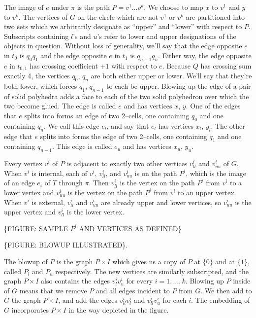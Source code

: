 The image of $e$ under $\pi$ is the path $P=v^1\dots v^k$.
We choose to map $x$ to $v^1$ and $y$ to $v^k$.
The vertices of $G$ on the circle which are not $v^1$ or $v^k$ are partitioned into two sets which we arbitrarily designate as ``upper'' and ``lower'' with respect to $P$.
Subscripts containing $l$'s and $u$'s refer to lower and upper designations of the objects in question.
Without loss of generality, we'll say that the edge opposite $e$ in $t_0$ is $q_0 q_1$ and the edge opposite $e$ in $t_1$ is $q_{n-1} q_n$. 
Either way, the edge opposite $e$ in $t_{0,1}$ has crossing coefficient $+1$ with respect to $e$.
Because $Q$ has crossing sum exactly 4, the vertices $q_0$, $q_n$ are both either upper or lower.
We'll say that they're both lower, which forces $q_1$, $q_{n-1}$ to each be upper.
Blowing up the edge of a pair of solid polyhedra adds a face to each of the two solid polyhedron over which the two become glued.
The edge is called $e$ and has vertices $x$, $y$.
One of the edges that $e$ splits into forms an edge of two 2--cells, one containing $q_0$ and one containing $q_n$.
We call this edge $e_l$, and say that $e_l$ has vertices $x_l$, $y_l$.
The other edge that $e$ splits into forms the edge of two 2--cells, one containing $q_1$ and one containing $q_{n-1}$.
This edge is called $e_u$ and has vertices $x_u$, $y_u$.

Every vertex $v^i$ of $P$ is adjacent to exactly two other vertices $v_{ll}^i$ and $v_{uu}^i$ of $G$.
When $v^i$ is internal, each of $v^i$, $v_{ll}^i$, and $v_{uu}^i$ is on the path $P^i$, which is the image of an edge $e_i$ of $T$ through $\pi$.
Then $v_{ll}^i$ is the vertex on the path $P^i$ from $v^i$ to a lower vertex and $v_{uu}^i$ is the vertex on the path $P^i$ from $v^i$ to an upper vertex.
When $v^i$ is external, $v_{ll}^i$ and $v_{uu}^i$ are already upper and lower vertices, so $v_{uu}^i$ is the upper vertex and $v_{ll}^i$ is the lower vertex.

\{FIGURE: SAMPLE $P^i$ AND VERTICES AS DEFINED\}


\{FIGURE: BLOWUP ILLUSTRATED\}.

The blowup of $P$ is the graph $P\times I$ which gives us a copy of $P$ at $\{0\}$ and at $\{1\}$, called $P_l$ and $P_u$ respectively.
The new vertices are similarly subscripted, and the graph $P\times I$ also contains the edges $v_l^i v_u^i$ for every $i=1,\dots,k$.
Blowing up $P$ inside of $G$ means that we remove $P$ and all edges incident to $P$ from $G$.
We then add to $G$ the graph $P\times I$, and add the edges $v_{ll}^i v_l^i$ and $v_{ll}^i v_u^i$ for each $i$.
The embedding of $G$ incorporates $P\times I$ in the way depicted in the figure.

